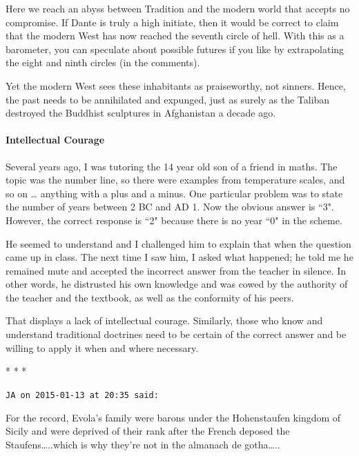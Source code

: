 Here we reach an abyss between Tradition and the modern world that accepts no compromise. If Dante is truly a high initiate, then it would be correct to claim that the modern West has now reached the seventh circle of hell. With this as a barometer, you can speculate about possible futures if you like by extrapolating the eight and ninth circles (in the comments).

Yet the modern West sees these inhabitants as praiseworthy, not sinners. Hence, the past needs to be annihilated and expunged, just as surely as the Taliban destroyed the Buddhist sculptures in Afghanistan a decade ago.

\paragraph{Intellectual Courage}
Several years ago, I was tutoring the 14 year old son of a friend in maths. The topic was the number line, so there were examples from temperature scales, and so on … anything with a plus and a minus. One particular problem was to state the number of years between 2 BC and AD 1. Now the obvious answer is ``3". However, the correct response is ``2" because there is no year ``0" in the scheme.

He seemed to understand and I challenged him to explain that when the question came up in class. The next time I saw him, I asked what happened; he told me he remained mute and accepted the incorrect answer from the teacher in silence. In other words, he distrusted his own knowledge and was cowed by the authority of the teacher and the textbook, as well as the conformity of his peers.

That displays a lack of intellectual courage. Similarly, those who know and understand traditional doctrines need to be certain of the correct answer and be willing to apply it when and where necessary.




\begin{center}* * *\end{center}

\begin{footnotesize}\begin{sffamily}



\texttt{JA on 2015-01-13 at 20:35 said: }

For the record, Evola's family were barons under the Hohenstaufen kingdom of Sicily and were deprived of their rank after the French deposed the Staufens…..which is why they're not in the almanach de gotha…..


\end{sffamily}\end{footnotesize}
